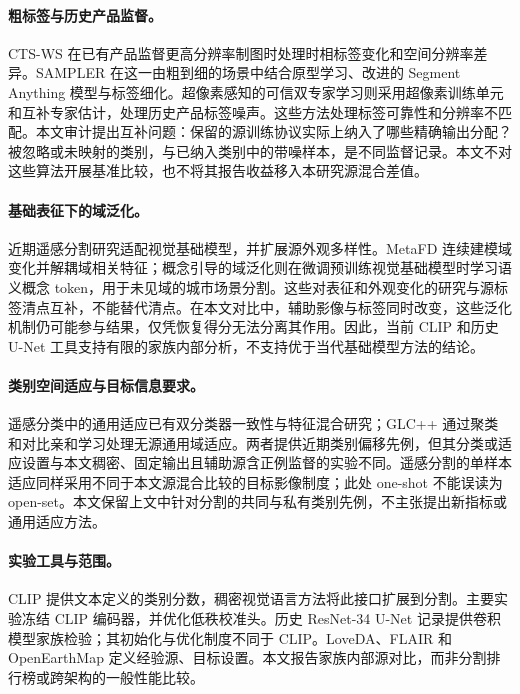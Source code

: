 \paragraph{粗标签与历史产品监督。}
CTS-WS 在已有产品监督更高分辨率制图时处理时相标签变化和空间分辨率差异\citep{ctsws2025}。SAMPLER 在这一由粗到细的场景中结合原型学习、改进的 Segment Anything 模型与标签细化\citep{sampler2025}。超像素感知的可信双专家学习则采用超像素训练单元和互补专家估计，处理历史产品标签噪声\citep{dualexpert2025}。这些方法处理标签可靠性和分辨率不匹配。本文审计提出互补问题：保留的源训练协议实际上纳入了哪些精确输出分配？被忽略或未映射的类别，与已纳入类别中的带噪样本，是不同监督记录。本文不对这些算法开展基准比较，也不将其报告收益移入本研究源混合差值。

\paragraph{基础表征下的域泛化。}
近期遥感分割研究适配视觉基础模型，并扩展源外观多样性\citep{luo2025vfmdg}。MetaFD 连续建模域变化并解耦域相关特征\citep{liang2025metafd}；概念引导的域泛化则在微调预训练视觉基础模型时学习语义概念 token，用于未见域的城市场景分割\citep{liao2025concept}。这些对表征和外观变化的研究与源标签清点互补，不能替代清点。在本文对比中，辅助影像与标签同时改变，这些泛化机制仍可能参与结果，仅凭恢复得分无法分离其作用。因此，当前 CLIP 和历史 U-Net 工具支持有限的家族内部分析，不支持优于当代基础模型方法的结论。

\paragraph{类别空间适应与目标信息要求。}
遥感分类中的通用适应已有双分类器一致性与特征混合研究\citep{li2025boostingunida}；GLC++ 通过聚类和对比亲和学习处理无源通用域适应\citep{qu2025glcpp}。两者提供近期类别偏移先例，但其分类或适应设置与本文稠密、固定输出且辅助源含正例监督的实验不同。遥感分割的单样本适应同样采用不同于本文源混合比较的目标影像制度\citep{tan2025oneshot}；此处 one-shot 不能误读为 open-set。本文保留上文中针对分割的共同与私有类别先例，不主张提出新指标或通用适应方法。

\paragraph{实验工具与范围。}
CLIP 提供文本定义的类别分数\citep{radford2021clip}，稠密视觉语言方法将此接口扩展到分割\citep{xu2022groupvit,zhou2022denseclip,li2022lseg}。主要实验冻结 CLIP 编码器，并优化低秩校准头。历史 ResNet-34 U-Net 记录提供卷积模型家族检验\citep{ronneberger2015unet}；其初始化与优化制度不同于 CLIP。LoveDA、FLAIR 和 OpenEarthMap 定义经验源、目标设置\citep{wang2021loveda,garioud2023flair,xia2023openearthmap}。本文报告家族内部源对比，而非分割排行榜或跨架构的一般性能比较。
